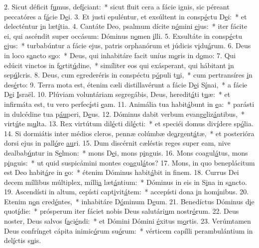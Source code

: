 2. Sicut déficit f\uline{u}mus, def\uline{í}ciant:~* sicut fluit cera a fácie ignis, sic péreant peccatóres a f\uline{á}cie D\uline{e}i.
3. Et justi epuléntur, et exsúltent in consp\uline{é}ctu D\uline{e}i:~* et delecténtur \uline{i}n læt\uline{í}tia.
4. Cantáte Deo, psalmum dícite n\uline{ó}mini \uline{e}jus:~* iter fácite ei, qui ascéndit super occásum: Dóminus n\uline{o}men \uline{i}lli.
5. Exsultáte in consp\uline{é}ctu \uline{e}jus:~* turbabúntur a fácie ejus, patris orphanórum et júdicis v\uline{i}du\uline{á}rum.
6. Deus in loco s\uline{a}ncto s\uline{u}o:~* Deus, qui inhabitáre facit uníus m\uline{o}ris in d\uline{o}mo:
7. Qui edúcit vinctos in f\uline{o}rtit\uline{ú}dine,~* simíliter eos qui exásperant, qui hábitant \uline{i}n sep\uline{ú}lcris.
8. Deus, cum egrederéris in conspéctu p\uline{ó}puli t\uline{u}i,~* cum pertransíres \uline{i}n des\uline{é}rto:
9. Terra mota est, étenim cæli distillavérunt a fácie D\uline{e}i S\uline{í}nai,~* a fácie D\uline{e}i \uline{I}sraël.
10. Plúviam voluntáriam segregábis, Deus, heredit\uline{á}ti t\uline{u}æ:~* et infirmáta est, tu vero perfec\uline{í}sti \uline{e}am.
11. Animália tua habit\uline{á}bunt in \uline{e}a:~* parásti in dulcédine tua p\uline{áu}peri, D\uline{e}us.
12. Dóminus dabit verbum evang\uline{e}liz\uline{á}ntibus,~* virt\uline{ú}te m\uline{u}lta.
13. Rex virtútum dil\uline{é}cti dil\uline{é}cti:~* et speciéi domus div\uline{í}dere sp\uline{ó}lia.
14. Si dormiátis inter médios cleros, pennæ colúmbæ de\uline{a}rgent\uline{á}tæ,~* et posterióra dorsi ejus in pall\uline{ó}re \uline{au}ri.
15. Dum discérnit cæléstis reges super eam, nive dealbab\uline{ú}ntur in S\uline{e}lmon:~* mons D\uline{e}i, mons p\uline{i}nguis.
16. Mons coagul\uline{á}tus, mons p\uline{i}nguis:~* ut quid suspicámini montes co\uline{a}gul\uline{á}tos?
17. Mons, in quo beneplácitum est Deo habit\uline{á}re in \uline{e}o:~* étenim Dóminus habit\uline{á}bit in f\uline{i}nem.
18. Currus Dei decem míllibus múltiplex, mílli\uline{a} læt\uline{á}ntium:~* Dóminus in eis in S\uline{i}na in s\uline{a}ncto.
19. Ascendísti in altum, cepísti capt\uline{i}vit\uline{á}tem:~* accepísti dona \uline{i}n hom\uline{í}nibus.
20. Etenim n\uline{o}n cred\uline{é}ntes,~* inhabitáre D\uline{ó}minum D\uline{e}um.
21. Benedíctus Dóminus d\uline{i}e quot\uline{í}die:~* prósperum iter fáciet nobis Deus salutári\uline{u}m nostr\uline{ó}rum.
22. Deus noster, Deus salvos f\uline{a}ci\uline{é}ndi:~* et Dómini Dómini \uline{é}xitus m\uline{o}rtis.
23. Verúmtamen Deus confrínget cápita inimic\uline{ó}rum su\uline{ó}rum:~* vérticem capílli perambulántium in del\uline{í}ctis s\uline{u}is.
